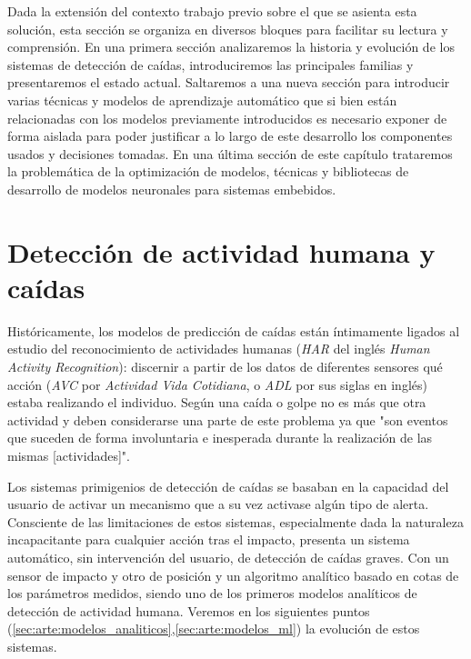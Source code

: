 
Dada la extensión del contexto trabajo previo sobre el que se asienta esta solución, esta sección se organiza en diversos bloques para facilitar su lectura y comprensión. En una primera sección analizaremos la historia y evolución de los sistemas de detección de caídas, introduciremos las principales familias y presentaremos el estado actual. Saltaremos a una nueva sección para introducir varias técnicas y modelos de aprendizaje automático que si bien están relacionadas con los modelos previamente introducidos es necesario exponer de forma aislada para poder justificar a lo largo de este desarrollo los componentes usados y decisiones tomadas. En una última sección de este capítulo trataremos la problemática de la optimización de modelos, técnicas y bibliotecas de desarrollo de modelos neuronales para sistemas embebidos.


\section{Detección de actividad humana y caídas}\label{sec:arte:detección_caídas}

Históricamente, los modelos de predicción de caídas están íntimamente ligados al estudio del reconocimiento de actividades humanas (\textit{HAR} del inglés \textit{Human Activity Recognition}): discernir a partir de los datos de diferentes sensores qué acción (\textit{AVC} por \textit{Actividad Vida Cotidiana}, o \textit{ADL} por sus siglas en inglés) estaba realizando el individuo. Según  una caída o golpe no es más que otra actividad y deben considerarse una parte de este problema ya que "son eventos que suceden de forma involuntaria e inesperada durante la realización de las mismas [actividades]".

Los sistemas primigenios de detección de caídas se basaban en la capacidad del usuario de activar un mecanismo que a su vez activase algún tipo de alerta. Consciente de las limitaciones de estos sistemas, especialmente dada la naturaleza incapacitante para cualquier acción tras el impacto,  presenta un sistema automático, sin intervención del usuario, de detección de caídas graves. Con un sensor de impacto y otro de posición y un algoritmo analítico basado en cotas de los parámetros medidos, siendo uno de los primeros modelos analíticos de detección de actividad humana. Veremos en los siguientes puntos (\ref{sec:arte:modelos_analiticos},\ref{sec:arte:modelos_ml}) la evolución de estos sistemas.

